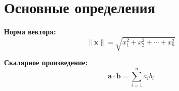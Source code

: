 \documentclass[12pt, a4paper]{article}
\begin{document}
\section*{Основные определения}

\textbf{Норма векторa:}
\[
\| \mathbf{x} \| = \sqrt{x_1^2 + x_2^2 + \cdots + x_n^2}
\]

\textbf{Скалярное произведение:}
\[
\mathbf{a} \cdot \mathbf{b} = \sum_{i=1}^n a_i b_i
\]
\end{document}
